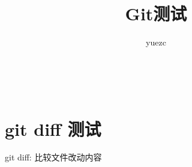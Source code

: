 \title{Git测试}
\author{yuezc}


    \maketitle
    ~
\section{git diff 测试}
    git diff: 比较文件改动内容
    ~

